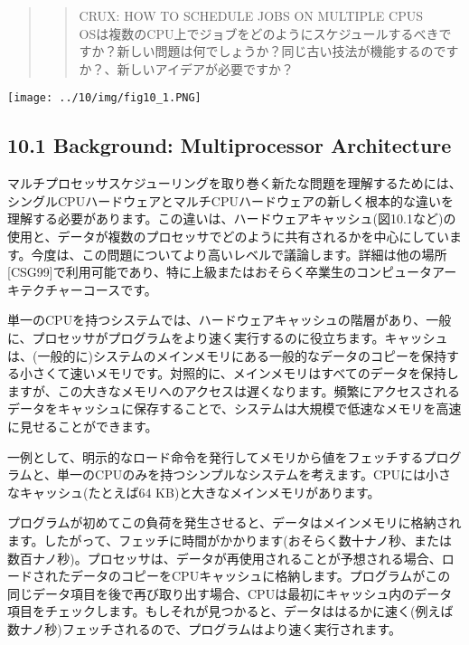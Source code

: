 \begin{quote}
\begin{quote}
CRUX: HOW TO SCHEDULE JOBS ON MULTIPLE CPUS\\
OSは複数のCPU上でジョブをどのようにスケジュールするべきですか？新しい問題は何でしょうか？同じ古い技法が機能するのですか？、新しいアイデアが必要ですか？
\end{quote}
\end{quote}

\texttt{[image: ../10/img/fig10\_1.PNG]}

\hypertarget{background-multiprocessor-architecture}{%
\subsection*{10.1 Background: Multiprocessor
Architecture}\label{background-multiprocessor-architecture}}

マルチプロセッサスケジューリングを取り巻く新たな問題を理解するためには、シングルCPUハードウェアとマルチCPUハードウェアの新しく根本的な違いを理解する必要があります。この違いは、ハードウェアキャッシュ(図10.1など)の使用と、データが複数のプロセッサでどのように共有されるかを中心にしています。今度は、この問題についてより高いレベルで議論します。詳細は他の場所{[}CSG99{]}で利用可能であり、特に上級またはおそらく卒業生のコンピュータアーキテクチャーコースです。

単一のCPUを持つシステムでは、ハードウェアキャッシュの階層があり、一般に、プロセッサがプログラムをより速く実行するのに役立ちます。キャッシュは、(一般的に)システムのメインメモリにある一般的なデータのコピーを保持する小さくて速いメモリです。対照的に、メインメモリはすべてのデータを保持しますが、この大きなメモリへのアクセスは遅くなります。頻繁にアクセスされるデータをキャッシュに保存することで、システムは大規模で低速なメモリを高速に見せることができます。

一例として、明示的なロード命令を発行してメモリから値をフェッチするプログラムと、単一のCPUのみを持つシンプルなシステムを考えます。CPUには小さなキャッシュ(たとえば64
KB)と大きなメインメモリがあります。

プログラムが初めてこの負荷を発生させると、データはメインメモリに格納されます。したがって、フェッチに時間がかかります(おそらく数十ナノ秒、または数百ナノ秒)。プロセッサは、データが再使用されることが予想される場合、ロードされたデータのコピーをCPUキャッシュに格納します。プログラムがこの同じデータ項目を後で再び取り出す場合、CPUは最初にキャッシュ内のデータ項目をチェックします。もしそれが見つかると、データははるかに速く(例えば数ナノ秒)フェッチされるので、プログラムはより速く実行されます。

